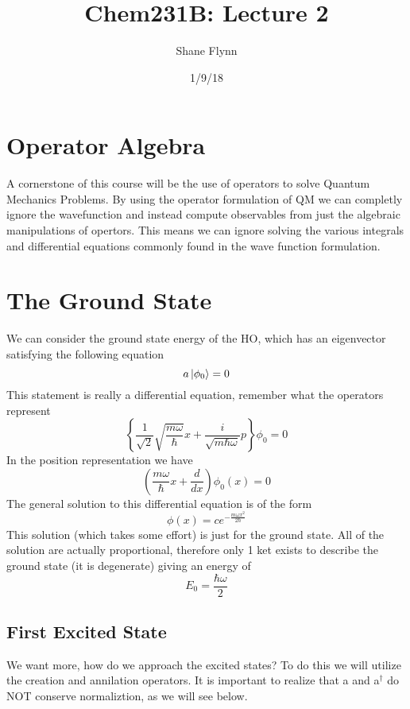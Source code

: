 \documentclass{article}
\title{Chem231B: Lecture 2}
\author{Shane Flynn}
\date{1/9/18}
\newcommand{\be}{\begin{equation}}
\newcommand{\ee}{\end{equation}}
\newcommand{\dg}{\dagger}
\begin{document}
\maketitle

\section*{Operator Algebra}
A cornerstone of this course will be the use of operators to solve Quantum Mechanics Problems. 
By using the operator formulation of QM we can completly ignore the wavefunction and instead compute observables from just the algebraic manipulations of opertors.
This means we can ignore solving the various integrals and differential equations commonly found in the wave function formulation. 

\section*{The Ground State}
We can consider the ground state energy of the HO, which has an eigenvector satisfying the following equation
\be
a\ket{\phi_0} = 0
\ee
This statement is really a differential equation, remember what the operators represent
\be
\left\{\frac{1}{\sqrt{2}} \sqrt{\frac{m\omega}{\hbar}}x + \frac{i}{\sqrt{m\hbar\omega}}p\right\}\phi_0 = 0
\ee
In the position representation  we have
\be
\left(\frac{m\omega}{\hbar}x + \frac{d}{dx}\right)\phi_0(x) = 0
\ee
The general solution to this differential equation is of the form 
\be
\phi(x) = ce^{-\frac{m\omega x^2}{2\hbar}}
\ee
This solution (which takes some effort) is just for the ground state.
All of the solution are actually proportional, therefore only 1 ket exists to describe the ground state (it is degenerate) giving an energy of
\be
E_0 = \frac{\hbar\omega}{2}
\ee

\subsection*{First Excited State}
We want more, how do we approach the excited states?
To do this we will utilize the creation and annilation operators.
It is important to realize that a and a$^\dg$ do NOT conserve normaliztion, as we will see below.
\end{document}
